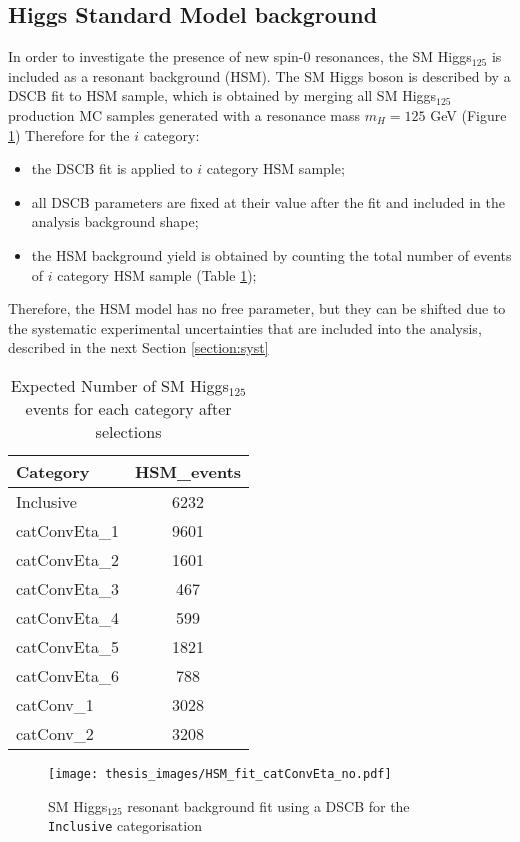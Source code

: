 \documentclass[a4paper, oneside, 11pt, openright]{book}
\begin{document}
 			\subsection{Higgs Standard Model background}
 				In order to investigate the presence of new spin-0 resonances, the SM Higgs$_{125}$ is included as a resonant background (HSM). The SM Higgs boson is described by a DSCB fit to HSM sample, which is obtained by merging all SM Higgs$_{125}$ production MC samples generated with a resonance mass $m_H=125$ GeV (Figure \ref{fig:HSM_fit}) Therefore for the $i$ category:
 				\begin{itemize}
 					\item the DSCB fit is applied to $i$ category HSM sample;
 					\item all DSCB parameters are fixed at their value after the fit and included in the analysis background shape;
 					\item the HSM background yield is obtained by counting the total number of events of $i$ category HSM sample (Table \ref{tab:HSM});
 				\end{itemize}  
 				Therefore, the HSM model has no free parameter, but they can be shifted due to the systematic experimental uncertainties that are included into the analysis, described in the next Section \ref{section:syst}
 				\begin{table}
 					\centering
						\begin{tabular}{lc}
							\toprule[1.5pt]
							Category &  HSM\_events \\
							\midrule
							Inclusive & 6232 \\
							\midrule
							catConvEta\_1 & 9601 \\
							catConvEta\_2 & 1601 \\
							catConvEta\_3 & 467 \\
							catConvEta\_4 & 599 \\
							catConvEta\_5 & 1821 \\
							catConvEta\_6 & 788 \\
							\midrule
							catConv\_1 & 3028 \\
							catConv\_2 & 3208 \\
							\bottomrule[1.5pt]
						\end{tabular}
 					\caption{Expected Number of SM Higgs$_{125}$ events for each category after selections}
 					\label{tab:HSM}
 				\end{table}
 				\begin{figure}[]
 					\centering
 					\texttt{[image: thesis\_images/HSM\_fit\_catConvEta\_no.pdf]}
 					\caption{SM Higgs$_{125}$ resonant background fit using a DSCB for the \texttt{Inclusive} categorisation}
 					\label{fig:HSM_fit}
 				\end{figure}
 			
\end{document}
